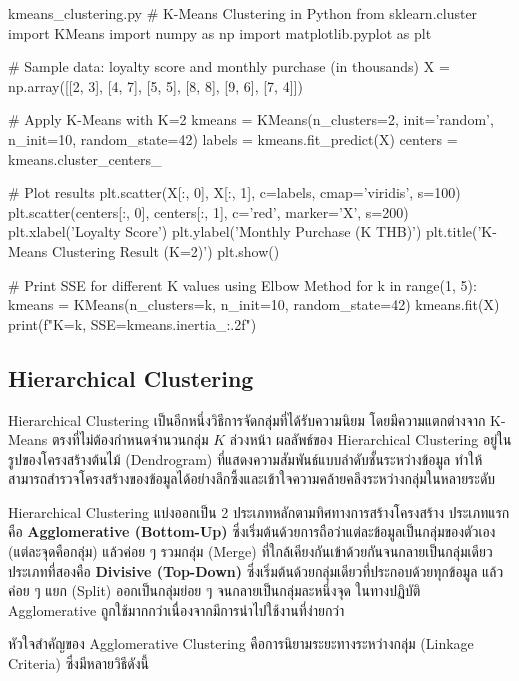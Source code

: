 \begin{pycode}{kmeans\_clustering.py}
# K-Means Clustering in Python
from sklearn.cluster import KMeans
import numpy as np
import matplotlib.pyplot as plt

# Sample data: loyalty score and monthly purchase (in thousands)
X = np.array([[2, 3], [4, 7], [5, 5], [8, 8], [9, 6], [7, 4]])

# Apply K-Means with K=2
kmeans = KMeans(n_clusters=2, init='random', n_init=10, random_state=42)
labels = kmeans.fit_predict(X)
centers = kmeans.cluster_centers_

# Plot results
plt.scatter(X[:, 0], X[:, 1], c=labels, cmap='viridis', s=100)
plt.scatter(centers[:, 0], centers[:, 1], c='red', marker='X', s=200)
plt.xlabel('Loyalty Score')
plt.ylabel('Monthly Purchase (K THB)')
plt.title('K-Means Clustering Result (K=2)')
plt.show()

# Print SSE for different K values using Elbow Method
for k in range(1, 5):
    kmeans = KMeans(n_clusters=k, n_init=10, random_state=42)
    kmeans.fit(X)
    print(f"K={k}, SSE={kmeans.inertia_:.2f}")
\end{pycode}

\subsection{Hierarchical Clustering}

Hierarchical Clustering เป็นอีกหนึ่งวิธีการจัดกลุ่มที่ได้รับความนิยม โดยมีความแตกต่างจาก K-Means ตรงที่ไม่ต้องกำหนดจำนวนกลุ่ม $K$ ล่วงหน้า ผลลัพธ์ของ Hierarchical Clustering อยู่ในรูปของโครงสร้างต้นไม้ (Dendrogram) ที่แสดงความสัมพันธ์แบบลำดับชั้นระหว่างข้อมูล ทำให้สามารถสำรวจโครงสร้างของข้อมูลได้อย่างลึกซึ้งและเข้าใจความคล้ายคลึงระหว่างกลุ่มในหลายระดับ

Hierarchical Clustering แบ่งออกเป็น 2 ประเภทหลักตามทิศทางการสร้างโครงสร้าง ประเภทแรกคือ \textbf{Agglomerative (Bottom-Up)} ซึ่งเริ่มต้นด้วยการถือว่าแต่ละข้อมูลเป็นกลุ่มของตัวเอง (แต่ละจุดคือกลุ่ม) แล้วค่อย ๆ รวมกลุ่ม (Merge) ที่ใกล้เคียงกันเข้าด้วยกันจนกลายเป็นกลุ่มเดียว ประเภทที่สองคือ \textbf{Divisive (Top-Down)} ซึ่งเริ่มต้นด้วยกลุ่มเดียวที่ประกอบด้วยทุกข้อมูล แล้วค่อย ๆ แยก (Split) ออกเป็นกลุ่มย่อย ๆ จนกลายเป็นกลุ่มละหนึ่งจุด ในทางปฏิบัติ Agglomerative ถูกใช้มากกว่าเนื่องจากมีการนำไปใช้งานที่ง่ายกว่า

หัวใจสำคัญของ Agglomerative Clustering คือการนิยามระยะทางระหว่างกลุ่ม (Linkage Criteria) ซึ่งมีหลายวิธีดังนี้

